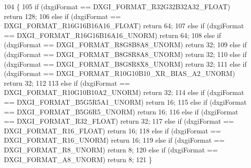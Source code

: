 \begin{DoxyCode}
104 \{
105     \textcolor{keywordflow}{if} (dxgiFormat == DXGI\_FORMAT\_R32G32B32A32\_FLOAT) \textcolor{keywordflow}{return} 128;
106     \textcolor{keywordflow}{else} \textcolor{keywordflow}{if} (dxgiFormat == DXGI\_FORMAT\_R16G16B16A16\_FLOAT) \textcolor{keywordflow}{return} 64;
107     \textcolor{keywordflow}{else} \textcolor{keywordflow}{if} (dxgiFormat == DXGI\_FORMAT\_R16G16B16A16\_UNORM) \textcolor{keywordflow}{return} 64;
108     \textcolor{keywordflow}{else} \textcolor{keywordflow}{if} (dxgiFormat == DXGI\_FORMAT\_R8G8B8A8\_UNORM) \textcolor{keywordflow}{return} 32;
109     \textcolor{keywordflow}{else} \textcolor{keywordflow}{if} (dxgiFormat == DXGI\_FORMAT\_B8G8R8A8\_UNORM) \textcolor{keywordflow}{return} 32;
110     \textcolor{keywordflow}{else} \textcolor{keywordflow}{if} (dxgiFormat == DXGI\_FORMAT\_B8G8R8X8\_UNORM) \textcolor{keywordflow}{return} 32;
111     \textcolor{keywordflow}{else} \textcolor{keywordflow}{if} (dxgiFormat == DXGI\_FORMAT\_R10G10B10\_XR\_BIAS\_A2\_UNORM) \textcolor{keywordflow}{return} 32;
112 
113     \textcolor{keywordflow}{else} \textcolor{keywordflow}{if} (dxgiFormat == DXGI\_FORMAT\_R10G10B10A2\_UNORM) \textcolor{keywordflow}{return} 32;
114     \textcolor{keywordflow}{else} \textcolor{keywordflow}{if} (dxgiFormat == DXGI\_FORMAT\_B5G5R5A1\_UNORM) \textcolor{keywordflow}{return} 16;
115     \textcolor{keywordflow}{else} \textcolor{keywordflow}{if} (dxgiFormat == DXGI\_FORMAT\_B5G6R5\_UNORM) \textcolor{keywordflow}{return} 16;
116     \textcolor{keywordflow}{else} \textcolor{keywordflow}{if} (dxgiFormat == DXGI\_FORMAT\_R32\_FLOAT) \textcolor{keywordflow}{return} 32;
117     \textcolor{keywordflow}{else} \textcolor{keywordflow}{if} (dxgiFormat == DXGI\_FORMAT\_R16\_FLOAT) \textcolor{keywordflow}{return} 16;
118     \textcolor{keywordflow}{else} \textcolor{keywordflow}{if} (dxgiFormat == DXGI\_FORMAT\_R16\_UNORM) \textcolor{keywordflow}{return} 16;
119     \textcolor{keywordflow}{else} \textcolor{keywordflow}{if} (dxgiFormat == DXGI\_FORMAT\_R8\_UNORM) \textcolor{keywordflow}{return} 8;
120     \textcolor{keywordflow}{else} \textcolor{keywordflow}{if} (dxgiFormat == DXGI\_FORMAT\_A8\_UNORM) \textcolor{keywordflow}{return} 8;
121 \}
\end{DoxyCode}
\mbox{\label{class_texture_loader_a326429e52878185255290f5bc1ae0219}} 
